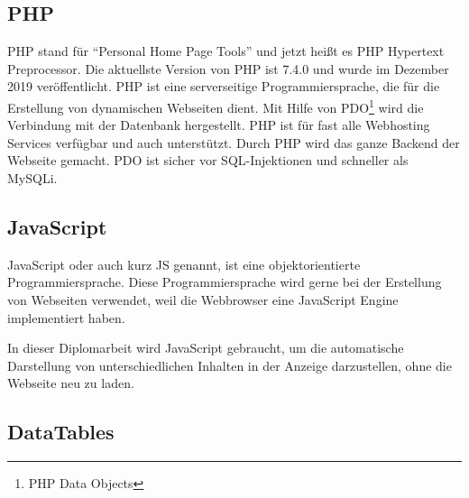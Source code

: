 
\subsection{PHP}
PHP stand f\"{u}r \textquotedblleft{}Personal Home Page Tools\textquotedblright{} und jetzt hei\ss{}t es PHP Hypertext Preprocessor. Die aktuellste Version von PHP ist 7.4.0 und wurde im Dezember 2019 ver\"{o}ffentlicht. PHP ist eine serverseitige Programmiersprache, die f\"{u}r die Erstellung von dynamischen Webseiten dient. Mit Hilfe von PDO\footnote{PHP Data Objects} wird die Verbindung mit der Datenbank hergestellt. PHP ist f\"{u}r fast alle Webhosting Services verf\"{u}gbar und auch unterst\"{u}tzt. 
Durch PHP wird das ganze Backend der Webseite gemacht. PDO ist sicher vor SQL-Injektionen und schneller als MySQLi. \cite{40_php}





\subsection{JavaScript}
JavaScript oder auch kurz JS genannt, ist eine objektorientierte Programmiersprache. Diese Programmiersprache wird gerne bei der Erstellung von Webseiten verwendet, weil die Webbrowser eine JavaScript Engine implementiert haben. \cite{40_js}

In dieser Diplomarbeit wird JavaScript gebraucht, um die automatische Darstellung von unterschiedlichen Inhalten in der Anzeige darzustellen, ohne die Webseite neu zu laden.





\subsection{DataTables}

